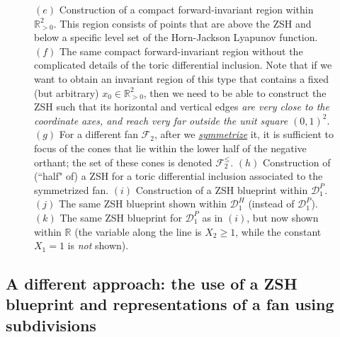 \documentclass[12pt,letterpaper]{article}
\newcommand{\D}{\mathcal{D}}
\newcommand{\F}{\mathcal{F}}
\newcommand{\RR}{\mathbb{R}}
\newcommand{\RRp}{\mathbb{R}_{>0}}
\begin{document}
\begin{figure}[htbp!]
{$(e)$ Construction of a compact forward-invariant region within $\RRp^2$. This region consists of points that are above the ZSH and below a specific level set of the Horn-Jackson Lyapunov function.
$(f)$ The same compact forward-invariant region without the complicated details of the toric differential inclusion. Note that if we want to obtain  an invariant region of this type that contains a fixed (but arbitrary) $x_0 \in \RRp^2$, then we need to be able to construct the ZSH such that its horizontal and vertical edges {\em are very close to the coordinate axes, and reach very far outside the unit square $(0,1)^2$}.
$(g)$ For a different fan $\F_2$, after we \ul{\em symmetrize} it, it is sufficient to focus of the cones that lie within the lower half of the negative orthant; the set of these cones is denoted $\F_2^\le$.
$(h)$ Construction of (``half" of) a ZSH for a toric differential inclusion associated to the symmetrized fan.
$(i)$ Construction of a ZSH blueprint within $\D_1^P$.  
$(j)$ The same ZSH blueprint shown within $\D_1^H$ (instead of $\D_1^P$). 
$(k)$ The same ZSH blueprint for $\D_1^P$ as in $(i)$, but now shown within $\RR$ (the variable along the line is $X_2 \ge 1$, while the constant $X_1=1$ is {\em not} shown).
}
\end{figure}









%




\subsection{A different approach: the use of a ZSH blueprint and representations of a fan using subdivisions}
\end{document}
